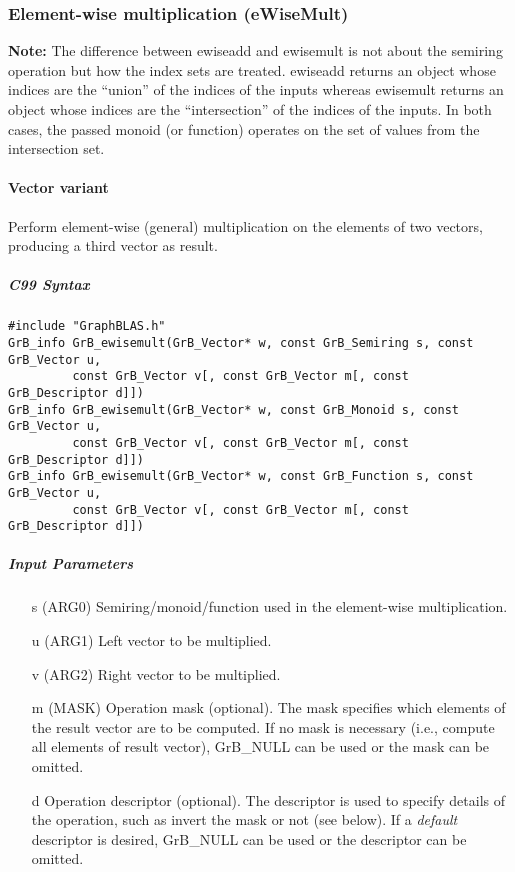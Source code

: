 \subsubsection{Element-wise multiplication ({\sf eWiseMult})}

{\bf Note:} The difference between {\sf ewiseadd} and {\sf ewisemult} is not about the semiring operation but how the index sets are treated.
 {\sf ewiseadd} returns an object whose indices are the ``union'' of the indices of the inputs whereas  
 {\sf ewisemult} returns an object whose indices are the ``intersection'' of the indices of the inputs. In both cases, the passed monoid (or function) operates on the 
 set of values from the intersection set. 
 
\paragraph{Vector variant}

Perform element-wise (general) multiplication on the elements of two vectors,
producing a third vector as result.

\subparagraph{C99 Syntax}

\begin{verbatim}
#include "GraphBLAS.h"
GrB_info GrB_ewisemult(GrB_Vector* w, const GrB_Semiring s, const GrB_Vector u,
         const GrB_Vector v[, const GrB_Vector m[, const GrB_Descriptor d]])
GrB_info GrB_ewisemult(GrB_Vector* w, const GrB_Monoid s, const GrB_Vector u,
         const GrB_Vector v[, const GrB_Vector m[, const GrB_Descriptor d]])
GrB_info GrB_ewisemult(GrB_Vector* w, const GrB_Function s, const GrB_Vector u,
         const GrB_Vector v[, const GrB_Vector m[, const GrB_Descriptor d]])
\end{verbatim}

\subparagraph{Input Parameters}

\begin{itemize}
	\item[{\sf s}] ({\sf ARG0}) Semiring/monoid/function used in the element-wise multiplication.

	\item[{\sf u}] ({\sf ARG1}) Left vector to be multiplied.

	\item[{\sf v}] ({\sf ARG2}) Right vector to be multiplied.

	\item[{\sf m}] ({\sf MASK}) Operation mask (optional). The mask
	specifies which elements of the result vector are to be computed.
	If no mask is necessary (i.e., compute all elements of result
	vector), {\sf GrB\_NULL} can be used or the mask can be omitted.

	\item[{\sf d}] Operation descriptor (optional). The descriptor
	is used to specify details of the operation, such as 
	invert the mask or not (see below). If a
	\emph{default} descriptor is desired, {\sf GrB\_NULL} can be
	used or the descriptor can be omitted.
\end{itemize}

